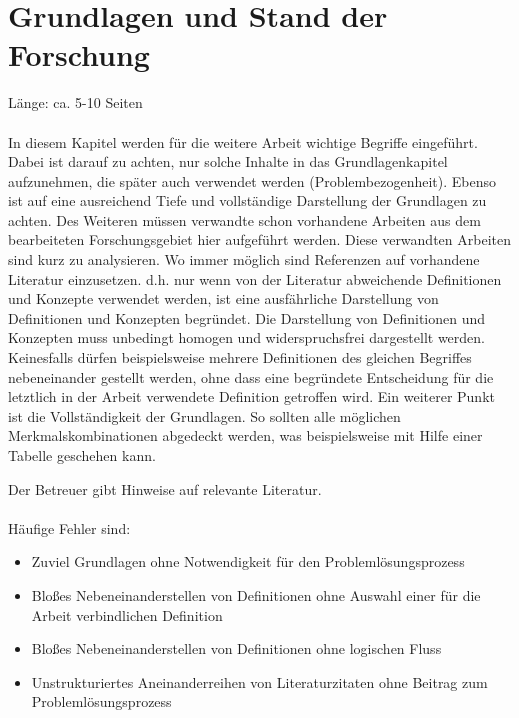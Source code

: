 \chapter{Grundlagen und Stand der Forschung}
Länge: ca. 5-10 Seiten\\\\

\noindent In diesem Kapitel werden für die weitere Arbeit wichtige Begriffe eingeführt. Dabei ist darauf zu achten, nur solche Inhalte in das Grundlagenkapitel aufzunehmen, die später auch verwendet werden (Problembezogenheit). Ebenso ist auf eine ausreichend Tiefe und vollständige Darstellung der Grundlagen zu achten. Des Weiteren müssen verwandte schon vorhandene Arbeiten aus dem bearbeiteten Forschungsgebiet hier aufgeführt werden. Diese verwandten Arbeiten sind kurz zu analysieren. Wo immer möglich sind Referenzen auf vorhandene Literatur einzusetzen. d.h. nur wenn von der Literatur abweichende Definitionen und Konzepte verwendet werden, ist eine ausfährliche Darstellung von Definitionen und Konzepten begründet. Die Darstellung von Definitionen und Konzepten muss unbedingt homogen und widerspruchsfrei dargestellt werden. Keinesfalls dürfen beispielsweise mehrere Definitionen des gleichen Begriffes nebeneinander gestellt werden, ohne dass eine begründete Entscheidung für die letztlich in der Arbeit verwendete Definition getroffen wird. Ein weiterer Punkt ist die Vollständigkeit der Grundlagen. So sollten alle möglichen Merkmalskombinationen abgedeckt werden, was beispielsweise mit Hilfe einer Tabelle geschehen kann.

\noindent Der Betreuer gibt Hinweise auf relevante Literatur.\\\\

\noindent Häufige Fehler sind:
\begin{itemize}
	\item Zuviel Grundlagen ohne Notwendigkeit für den Problemlösungsprozess
	\item	Bloßes Nebeneinanderstellen von Definitionen ohne Auswahl einer für die Arbeit verbindlichen Definition
	\item Bloßes Nebeneinanderstellen von Definitionen ohne logischen Fluss
	\item	Unstrukturiertes Aneinanderreihen von Literaturzitaten ohne Beitrag zum Problemlösungsprozess
\end{itemize}
